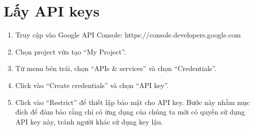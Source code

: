 \documentclass[../thesis.tex]{subfiles}
\begin{document}
\section{Lấy API keys}

\begin{enumerate}
	\item Truy cập vào Google API Console: https://console.developers.google.com 
	\item Chọn project vừa tạo ``My Project''.
	\item Từ menu bên trái, chọn ``APIs \& services'' và chọn ``Credentials''.
	\item Click vào ``Create credentials'' và chọn ``API key''.
	\item Click vào ``Restrict'' để thiết lập bảo mật cho API key. Bước này nhằm mục đích để đảm bảo rằng chỉ có ứng dụng của chúng ta mới có quyền sử dụng API key này, tránh người khác sử dụng key lậu.
\end{enumerate}
\end{document}
